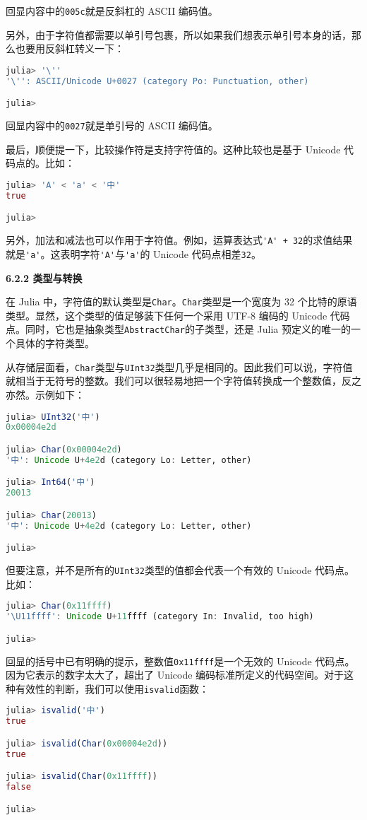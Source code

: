 回显内容中的\verb|005c|就是反斜杠的 ASCII 编码值。

另外，由于字符值都需要以单引号包裹，所以如果我们想表示单引号本身的话，那么也要用反斜杠转义一下：
\begin{lstlisting}[language=julia]
julia> '\''
'\'': ASCII/Unicode U+0027 (category Po: Punctuation, other)

julia> 
\end{lstlisting}

回显内容中的\verb|0027|就是单引号的 ASCII 编码值。

最后，顺便提一下，比较操作符是支持字符值的。这种比较也是基于 Unicode 代码点的。比如：
\begin{lstlisting}[language=julia]
julia> 'A' < 'a' < '中'
true

julia> 
\end{lstlisting}

另外，加法和减法也可以作用于字符值。例如，运算表达式\verb|'A' + 32|的求值结果就是\verb|'a'|。这表明字符\verb|'A'|与\verb|'a'|的 Unicode 代码点相差\verb|32|。

\textbf{6.2.2 类型与转换}

在 Julia 中，字符值的默认类型是\verb|Char|。\verb|Char|类型是一个宽度为 32 个比特的原语类型。显然，这个类型的值足够装下任何一个采用 UTF-8 编码的 Unicode 代码点。同时，它也是抽象类型\verb|AbstractChar|的子类型，还是 Julia 预定义的唯一的一个具体的字符类型。

从存储层面看，\verb|Char|类型与\verb|UInt32|类型几乎是相同的。因此我们可以说，字符值就相当于无符号的整数。我们可以很轻易地把一个字符值转换成一个整数值，反之亦然。示例如下：
\begin{lstlisting}[language=julia]
julia> UInt32('中')
0x00004e2d

julia> Char(0x00004e2d)
'中': Unicode U+4e2d (category Lo: Letter, other) 

julia> Int64('中')
20013

julia> Char(20013)
'中': Unicode U+4e2d (category Lo: Letter, other)

julia> 
\end{lstlisting}

但要注意，并不是所有的\verb|UInt32|类型的值都会代表一个有效的 Unicode 代码点。比如：
\begin{lstlisting}[language=julia]
julia> Char(0x11ffff)
'\U11ffff': Unicode U+11ffff (category In: Invalid, too high)

julia> 
\end{lstlisting}

回显的括号中已有明确的提示，整数值\verb|0x11ffff|是一个无效的 Unicode 代码点。因为它表示的数字太大了，超出了 Unicode 编码标准所定义的代码空间。对于这种有效性的判断，我们可以使用\verb|isvalid|函数：
\begin{lstlisting}[language=julia]
julia> isvalid('中')
true

julia> isvalid(Char(0x00004e2d))
true

julia> isvalid(Char(0x11ffff))
false

julia> 
\end{lstlisting}

